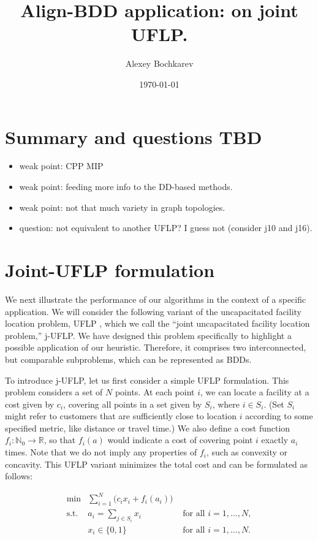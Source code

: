 \documentclass[11pt]{article}
\author{Alexey Bochkarev}
\date{\today}
\title{Align-BDD application: on joint UFLP.}
\begin{document}
\maketitle
\section{Summary and questions TBD}
\label{sec:orga35b469}
\begin{itemize}
\item weak point: CPP MIP
\item weak point: feeding more info to the DD-based methods.
\item weak point: not that much variety in graph topologies.
\item question: not equivalent to another UFLP? I guess not (consider j10 and j16).
\end{itemize}

\section{Joint-UFLP formulation}
\label{sec:jUFLP}
We next illustrate the performance of our algorithms in the context of a
specific application. We will consider the following variant of the
uncapacitated facility location problem, UFLP \citep{owen1998,revelle2008}, which
we call the ``joint uncapacitated facility location problem,'' j-UFLP. We have
designed this problem specifically to highlight a possible application of our
heuristic. Therefore, it comprises two interconnected, but comparable
subproblems, which can be represented as BDDs.

To introduce j-UFLP, let us first consider a simple UFLP formulation. This
problem considers a set of \(N\) points. At each point \(i\), we can locate a
facility at a cost given by \(c_i\), covering all points in a set given by \(S_i\),
where \(i \in S_i\). (Set \(S_i\) might refer to customers that are sufficiently
close to location \(i\) according to some specified metric, like distance or
travel time.) We also define a cost function \(f_i:
\mathbb{N}_0\rightarrow\mathbb{R}\), so that \(f_i(a)\) would indicate a cost of
covering point \(i\) exactly \(a_i\) times. Note that we do not imply any properties
of \(f_i\), such as convexity or concavity. This UFLP variant minimizes the total
cost and can be formulated as follows:

\begin{subequations}\label{eq:UFLP}
\begin{align}
  \min & \sum_{i=1}^N \Big(c_i x_i + f_i(a_i)\Big)&\\
    \textrm{s.t. } & a_i = \sum_{j\in S_i} x_i& \textrm{ for all } i=1,\ldots, N,\\
    & x_i\in\{0,1\} & \textrm{ for all } i=1,\ldots,N.
\end{align}
\end{subequations}
\end{document}
